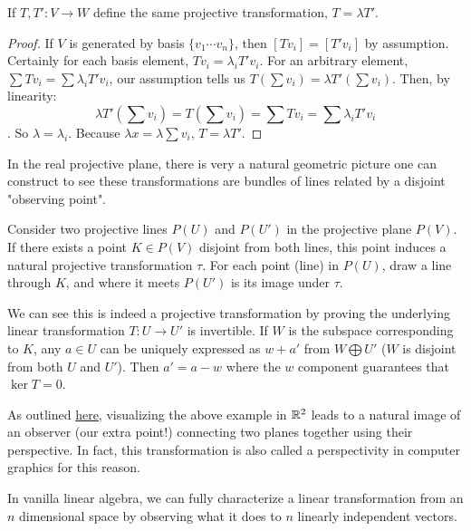 \documentclass[10pt]{article}
\begin{document}
\begin{proposition}
	If $T, T': V \to W$ define the same projective transformation, $T = \lambda T'$.
\end{proposition}

\begin{proof}
	If $V$ is generated by basis $\{ v_1 \cdots v_n \}$, then $[Tv_i] = [T'v_i]$
	by assumption. Certainly for each basis element, $Tv_i = \lambda_i T'v_i$.
	For an arbitrary element, $\sum Tv_i = \sum \lambda_i T'v_i$, our assumption tells us $T(\sum v_i) = \lambda
	T'(\sum v_i)$.
	Then, by linearity: \[ \lambda T'(\sum v_i) = T(\sum v_i) = \sum Tv_i = \sum \lambda_i T'v_i\].
	So $\lambda = \lambda_i$. Because $\lambda x = \lambda \sum v_i$, $T = \lambda T'$.
\end{proof}

In the real projective plane, there is very a natural geometric picture one can
construct to see these transformations are bundles of lines related by a
disjoint "observing point".

\begin{example}
Consider two projective lines $P(U)$ and $P(U')$ in the projective plane
$P(V)$. If there exists a point $K \in P(V)$ disjoint from both lines, this
point induces a natural projective transformation $\tau$. For each point (line) in
$P(U)$, draw a line through $K$, and where it meets $P(U')$ is its image under
$\tau$.

We can see this is indeed a projective transformation by proving the underlying
linear transformation $T: U \to U'$ is invertible. If $W$ is the subspace
corresponding to $K$, any $a \in U$ can be uniquely expressed as $w +
a'$ from $W \bigoplus U'$ ($W$ is disjoint from both $U$ and $U'$). Then $a' =
a - w$ where the $w$ component guarantees that $\ker T = 0$.

\end{example}

\begin{note}
	As outlined \href{https://en.wikipedia.org/wiki/Homography#Geometric_motivation}{here},
visualizing the above example in $\mathbb{R}^2$ leads to a natural image of an observer
(our extra point!) connecting two planes together using their perspective. In
fact, this transformation is also called a perspectivity in computer graphics for this
reason.
\end{note}

In vanilla linear algebra, we can fully characterize a linear transformation from an
$n$ dimensional space by observing what it does to $n$ linearly independent
vectors. 
\end{document}
